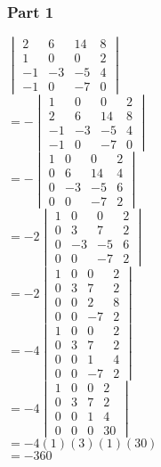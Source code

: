 \documentclass{report}
\begin{document}
\subsubsection*{Part 1}
$\begin{vmatrix}
    2 & 6 & 14 & 8 \\ 
    1 & 0 & 0 & 2 \\ 
    -1 & -3 & -5 & 4 \\ 
    -1 & 0 & -7 & 0
\end{vmatrix}$\\\vspace{3mm}
$=-\begin{vmatrix}
    1 & 0 & 0 & 2 \\
    2 & 6 & 14 & 8 \\ 
    -1 & -3 & -5 & 4 \\ 
    -1 & 0 & -7 & 0
\end{vmatrix}$\\\vspace{3mm}
$=-\begin{vmatrix}
    1 & 0 & 0 & 2 \\
    0 & 6 & 14 & 4 \\ 
    0 & -3 & -5 & 6 \\ 
    0 & 0 & -7 & 2
\end{vmatrix}$\\\vspace{3mm}
$=-2\begin{vmatrix}
    1 & 0 & 0 & 2 \\
    0 & 3 & 7 & 2 \\ 
    0 & -3 & -5 & 6 \\ 
    0 & 0 & -7 & 2
\end{vmatrix}$\\\vspace{3mm}
$=-2\begin{vmatrix}
    1 & 0 & 0 & 2 \\
    0 & 3 & 7 & 2 \\ 
    0 & 0 & 2 & 8 \\ 
    0 & 0 & -7 & 2
\end{vmatrix}$\\\vspace{3mm}
$=-4\begin{vmatrix}
    1 & 0 & 0 & 2 \\
    0 & 3 & 7 & 2 \\ 
    0 & 0 & 1 & 4 \\ 
    0 & 0 & -7 & 2
\end{vmatrix}$\\\vspace{3mm}
$=-4\begin{vmatrix}
    1 & 0 & 0 & 2 \\
    0 & 3 & 7 & 2 \\ 
    0 & 0 & 1 & 4 \\ 
    0 & 0 & 0 & 30
\end{vmatrix}$\\\vspace{3mm}
$=-4(1)(3)(1)(30)$\\\vspace{3mm}
$=-360$
\end{document}
